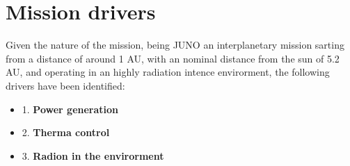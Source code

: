 \section{Mission drivers}
\label{sec:drivers}

Given the nature of the mission, being JUNO an interplanetary mission sarting from a distance of around 1 AU, with an nominal distance from the sun of 5.2 AU, and operating in an highly radiation 
intence envirorment, the following drivers have been identified: 

\begin{itemize}
    \item 1. \textbf{Power generation}
    \item 2. \textbf{Therma control}
    \item 3. \textbf{Radion in the envirorment}
\end{itemize}
